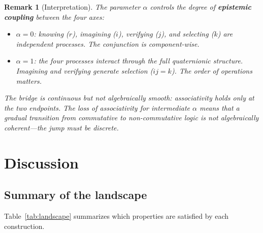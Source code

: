 \documentclass[11pt,a4paper]{article}
\newtheorem{remark}[theorem]{Remark}
\begin{document}
\begin{remark}[Interpretation]
The parameter $\alpha$ controls the degree of \textbf{epistemic
coupling} between the four axes:
\begin{itemize}[nosep]
\item $\alpha = 0$: knowing ($r$), imagining ($i$), verifying ($j$),
  and selecting ($k$) are independent processes. The conjunction is
  component-wise.
\item $\alpha = 1$: the four processes interact through the full
  quaternionic structure. Imagining and verifying generate selection
  ($ij = k$). The order of operations matters.
\end{itemize}
The bridge is continuous but not algebraically smooth: associativity
holds only at the two endpoints. The loss of associativity for
intermediate $\alpha$ means that a gradual transition from commutative
to non-commutative logic is not algebraically coherent---the jump must
be discrete.
\end{remark}

\section{Discussion}
\label{sec:discussion}

\subsection{Summary of the landscape}

Table~\ref{tab:landscape} summarizes which properties are satisfied by
each construction.
\end{document}

